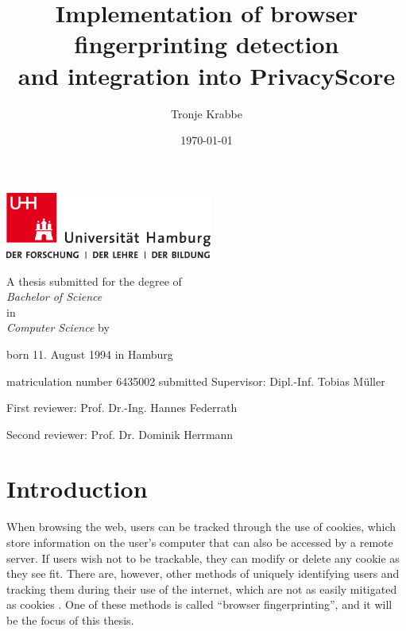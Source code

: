 \documentclass[
    fontsize=12pt,
    headings=small,
    parskip=half,
    bibliography=totoc,
    numbers=noenddot,
    open=any
    ]{scrreprt}
\title{
    Implementation of browser fingerprinting detection \\
    and integration into PrivacyScore
}
\author{Tronje Krabbe}
\date{\today}
\begin{document}
\hypersetup{hidelinks}


\newpage
\thispagestyle{empty}
\begin{titlepage}%
\includegraphics[width=6.8cm]{images/up-uhh-logo-u-2010-u-farbe-u-rgb.pdf}
\begin{center}\large
    \vfill
	\makeatletter
	{\Large\textsf{\textbf{\@title}}\par}
	\makeatother
	\vfill
    A thesis submitted for the degree of \\
    \textit{Bachelor of Science} \\
    in \\
    \textit{Computer Science}
	\vfill
    by
	\par\bigskip
	\makeatletter
	{\@author} \par
	\makeatother
	born 11. August 1994 in Hamburg \par
	matriculation number 6435002
	\vfill
	\makeatletter
	submitted {\@date}
	\makeatother
	\vfill
	Supervisor: Dipl.-Inf. Tobias Müller \par
	First reviewer: Prof. Dr.-Ing. Hannes Federrath \par
	Second reviewer: Prof. Dr. Dominik Herrmann
\end{center}
\end{titlepage}%

\setcounter{tocdepth}{1}
\tableofcontents

\chapter{Introduction}
\label{chap:introduction}

When browsing the web, users can be tracked through the use of cookies, which store information on the user's computer
that can also be accessed by a remote server.
If users wish not to be trackable, they can modify or delete any cookie as they see fit.
There are, however, other methods of uniquely identifying users and tracking them during their use of the internet,
which are not as easily mitigated as cookies \cite{am_i_unique}. One of these methods is called ``browser fingerprinting'',
and it will be the focus of this thesis.
\end{document}
